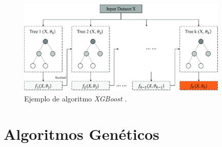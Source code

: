 \documentclass{uathesis-es}
\begin{document}
	\begin{figure}[H]
		\centering
		\includegraphics[width=10cm]{Figures/Background/XGBoost-model-process.png}
		\caption{Ejemplo de algoritmo \textit{XGBoost} \cite{XGBOOST_IMAGE}.}
		\label{XGBOOST_BACKGROUND}
	\end{figure}
	
	
	
	
	
	
	
	
	
	\section{Algoritmos Genéticos}
	
	
\end{document}

